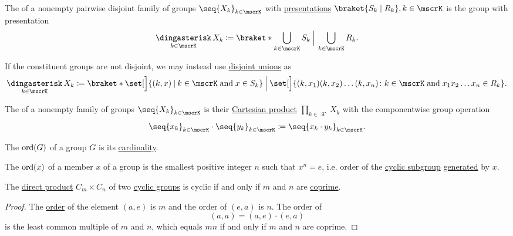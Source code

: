 \begin{definition}\label{def:group_free_product}
  The  of a nonempty pairwise disjoint family of groups \( \seq{ X_k }_{k \in \mscrK} \) with \hyperref[def:group_presentation]{presentations} \( \braket{S_k \mid R_k}, k \in \mscrK \) is the group with presentation
  \begin{equation*}
    \Ast_{k \in \mscrK} X_k \coloneqq \braket*{ \bigcup_{k \in \mscrK} S_k \given[\Big] \bigcup_{k \in \mscrK} R_k }.
  \end{equation*}

  If the constituent groups are not disjoint, we may instead use \hyperref[def:disjoint_union]{disjoint unions} as
  \small
  \begin{equation*}
    \Ast_{k \in \mscrK} X_k \coloneqq \braket*{ \set[\Big]{ (k, x) \given k \in \mscrK \T{and} x \in S_k } \given[\Big] \set[\Big]{ (k, x_1) (k, x_2) \ldots (k, x_n) \colon k \in \mscrK \T{and} x_1 x_2 \ldots x_n \in R_k } }.
  \end{equation*}
  \normalsize
\end{definition}

\begin{definition}\label{def:group_direct_product}
  The  of a nonempty family of groups \( \seq{ X_k }_{k \in \mscrK} \) is their \hyperref[def:cartesian_product]{Cartesian product} \( \prod_{k \in \mscrK} X_k \) with the componentwise group operation
  \begin{equation*}
    \seq{ x_k }_{k \in \mscrK} \cdot \seq{ y_k }_{k \in \mscrK}
    \coloneqq
    \seq{ x_k \cdot y_k }_{k \in \mscrK}.
  \end{equation*}
\end{definition}

\begin{definition}\label{def:group_order}
  The  \( \operatorname{ord}(G) \) of a group \( G \) is its \hyperref[thm:cardinality_existence]{cardinality}.

  The  \( \operatorname{ord}(x) \) of a member \( x \) of a group is the smallest positive integer \( n \) such that \( x^n = e \), i.e. order of the \hyperref[def:cyclic_group]{cyclic subgroup} \hyperref[def:first_order_generated_substructure]{generated} by \( x \).
\end{definition}

\begin{proposition}\label{thn:product_of_cyclic_groups}
  The \hyperref[def:group_direct_product]{direct product} \( C_m \times C_n \) of two \hyperref[def:cyclic_group]{cyclic groups} is cyclic if and only if \( m \) and \( n \) are \hyperref[def:coprime_numbers]{coprime}.
\end{proposition}
\begin{proof}
  The \hyperref[def:group_order]{order} of the element \( (a, e) \) is \( m \) and the order of \( (e, a) \) is \( n \). The order of
  \begin{equation*}
    (a, a) = (a, e) \cdot (e, a)
  \end{equation*}
  is the least common multiple of \( m \) and \( n \), which equals \( mn \) if and only if \( m \) and \( n \) are coprime.
\end{proof}

